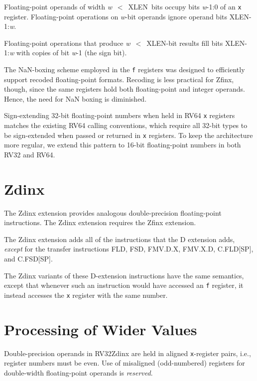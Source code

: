 Floating-point operands of width \mbox{{\em w} $<$ XLEN bits} occupy bits
\mbox{{\em w}-1:0} of an {\tt x} register.
Floating-point operations on {\em w}-bit operands ignore operand bits
\mbox{XLEN-1:{\em w}}.

Floating-point operations that produce \mbox{{\em w} $<$ XLEN-bit} results
fill bits \mbox{XLEN-1:{\em w}} with copies of bit \mbox{{\em w}-1} (the
sign bit).

\begin{commentary}
The NaN-boxing scheme employed in the {\tt f} registers was designed to
efficiently support recoded floating-point formats.
Recoding is less practical for Zfinx, though, since the same registers
hold both floating-point and integer operands.
Hence, the need for NaN boxing is diminished.

Sign-extending 32-bit floating-point numbers when held in RV64 {\tt x}
registers matches the existing RV64 calling conventions, which require all
32-bit types to be sign-extended when passed or returned in {\tt x} registers.
To keep the architecture more regular, we extend this pattern to 16-bit
floating-point numbers in both RV32 and RV64.
\end{commentary}

\section{Zdinx}

The Zdinx extension provides analogous double-precision floating-point
instructions.
The Zdinx extension requires the Zfinx extension.

The Zdinx extension adds all of the instructions that the D extension
adds, {\em except} for the transfer instructions FLD, FSD, FMV.D.X,
FMV.X.D, C.FLD[SP], and C.FSD[SP].

The Zdinx variants of these D-extension instructions have the same semantics,
except that whenever such an instruction would have accessed an {\tt f}
register, it instead accesses the {\tt x} register with the same number.

\section{Processing of Wider Values}

Double-precision operands in RV32Zdinx
are held in aligned {\tt x}-register pairs, i.e.,
register numbers must be even.
Use of misaligned (odd-numbered) registers for double-width floating-point
operands is {\em reserved}.

